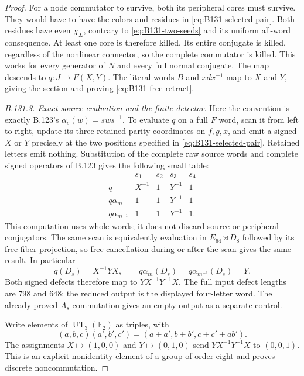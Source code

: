 \begin{proof}
For a node commutator to survive, both its peripheral cores must survive.
They would have to have the colors and residues in
\eqref{eq:B131-selected-pair}. Both residues have even $\chi_\Sigma$,
contrary to \eqref{eq:B131-two-seeds} and its uniform all-word consequence.
At least one core is therefore killed. Its entire conjugate is killed,
regardless of the nonlinear connector, so the complete commutator is
killed. This works for every generator of $N$ and every full normal
conjugate. The map descends to $q:J\to F(X,Y)$.
The literal words $B$ and $x\bar d x^{-1}$ map to $X$ and $Y$, giving
the section and proving \eqref{eq:B131-free-retract}.

\emph{B.131.3. Exact source evaluation and the finite detector.}
Here the convention is exactly B.123's
$\alpha_s(w)=sws^{-1}$. To evaluate $q$ on a full $F$ word, scan it
from left to right, update its three retained parity coordinates on
$f,g,x$, and emit a signed $X$ or $Y$ precisely at the two positions
specified in \eqref{eq:B131-selected-pair}. Retained letters emit nothing.
Substitution of the complete raw source words and complete signed
operators of B.123 gives the following small table:
\begin{equation}\label{eq:B131-source-image-table}
\begin{array}{c|rrrr}
 &s_1&s_2&s_3&s_4\\\hline
 q&X^{-1}&1&Y^{-1}&1\\
 q\alpha_m&1&1&Y^{-1}&1\\
 q\alpha_{m^{-1}}&1&1&Y^{-1}&1.
\end{array}
\end{equation}
This computation uses whole words; it does not discard source or
peripheral conjugators. The same scan is equivalently evaluation in
$E_{64}\rtimes D_8$ followed by its free-fiber projection, so free
cancellation during or after the scan gives the same result.
In particular
\[
 q(D_s)=X^{-1}YX,\qquad
 q\alpha_m(D_s)=q\alpha_{m^{-1}}(D_s)=Y.
\]
Both signed defects therefore map to $YX^{-1}Y^{-1}X$. The full input
defect lengths are $798$ and $648$; the reduced output is the displayed
four-letter word. The already proved $A_s$ commutation gives an empty
output as a separate control.

Write elements of $\operatorname{UT}_3(\mathbb F_2)$ as triples, with
\[
 (a,b,c)(a',b',c')=(a+a',b+b',c+c'+ab').
\]
The assignments $X\mapsto(1,0,0)$ and $Y\mapsto(0,1,0)$ send
$YX^{-1}Y^{-1}X$ to $(0,0,1)$. This is an explicit nonidentity element
of a group of order eight and proves discrete noncommutation.


\end{proof}
